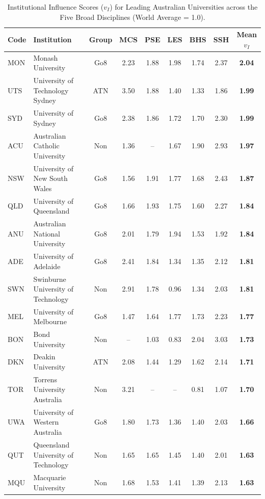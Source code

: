 \begin{table}[htbp]
\centering
\small
\caption{Institutional Influence Scores ($v_I$) for Leading Australian Universities across the Five Broad Disciplines (World Average = 1.0).}
\label{tab:hep_summary}
\begin{tabularx}{\textwidth}{l >{\raggedright\arraybackslash}X c cccccc}
\toprule
\textbf{Code} & \textbf{Institution} & \textbf{Group} & \textbf{MCS} & \textbf{PSE} & \textbf{LES} & \textbf{BHS} & \textbf{SSH} & \textbf{Mean $v_I$} \\
\midrule
MON & Monash University & Go8 & 2.23 & 1.88 & 1.98 & 1.74 & 2.37 & \textbf{2.04} \\
UTS & University of Technology Sydney & ATN & 3.50 & 1.88 & 1.40 & 1.33 & 1.86 & \textbf{1.99} \\
SYD & University of Sydney & Go8 & 2.38 & 1.86 & 1.72 & 1.70 & 2.30 & \textbf{1.99} \\
ACU & Australian Catholic University & Non & 1.36 & -- & 1.67 & 1.90 & 2.93 & \textbf{1.97} \\
NSW & University of New South Wales & Go8 & 1.56 & 1.91 & 1.77 & 1.68 & 2.43 & \textbf{1.87} \\
QLD & University of Queensland & Go8 & 1.66 & 1.93 & 1.75 & 1.60 & 2.27 & \textbf{1.84} \\
ANU & Australian National University & Go8 & 2.01 & 1.79 & 1.94 & 1.53 & 1.92 & \textbf{1.84} \\
ADE & University of Adelaide & Go8 & 2.41 & 1.84 & 1.34 & 1.35 & 2.12 & \textbf{1.81} \\
SWN & Swinburne University of Technology & Non & 2.91 & 1.78 & 0.96 & 1.34 & 2.03 & \textbf{1.81} \\
MEL & University of Melbourne & Go8 & 1.47 & 1.64 & 1.77 & 1.73 & 2.23 & \textbf{1.77} \\
BON & Bond University & Non & -- & 1.03 & 0.83 & 2.04 & 3.03 & \textbf{1.73} \\
DKN & Deakin University & ATN & 2.08 & 1.44 & 1.29 & 1.62 & 2.14 & \textbf{1.71} \\
TOR & Torrens University Australia & Non & 3.21 & -- & -- & 0.81 & 1.07 & \textbf{1.70} \\
UWA & University of Western Australia & Go8 & 1.80 & 1.73 & 1.36 & 1.40 & 2.03 & \textbf{1.66} \\
QUT & Queensland University of Technology & Non & 1.65 & 1.65 & 1.45 & 1.40 & 2.01 & \textbf{1.63} \\
MQU & Macquarie University & Non & 1.68 & 1.53 & 1.41 & 1.39 & 2.13 & \textbf{1.63} \\

\end{tabularx}
\end{table}
